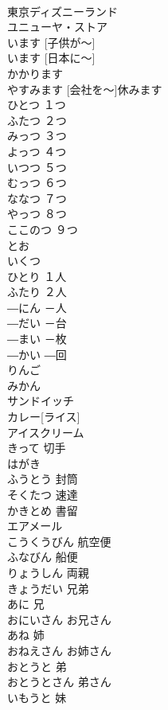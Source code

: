\documentclass[8pt]{extreport}
\begin{document}
\begin{CJK}{UTF8}{min}
\\	東京ディズニーランド		
\\	ユニューヤ・ストア			
\\	[こどもが～] います	[子供が～]	
\\	[にほんに～] います	[日本に～]	
\\	かかります			
\\	[かいしゃを～] やすみます	[会社を～]休みます	
\\	ひとつ	１つ		
\\	ふたつ	２つ		
\\	みっつ	３つ		
\\	よっつ	４つ		
\\	いつつ	５つ		
\\	むっつ	６つ		
\\	ななつ	７つ		
\\	やっつ	８つ		
\\	ここのつ	９つ		
\\	とお	
\\	いくつ			
\\	ひとり	１人	
\\	ふたり	２人	
\\	―にん	－人	
\\	―だい	－台	
\\	―まい	－枚	
\\	―かい	―回	
\\	りんご			
\\	みかん			
\\	サンドイッチ			
\\	カレー[ライス]			
\\	アイスクリーム			
\\	きって	切手	
\\	はがき			
\\	ふうとう	封筒	
\\	そくたつ	速達	
\\	かきとめ	書留	
\\	エアメール			
\\	こうくうびん	航空便	
\\	ふなびん	船便	
\\	りょうしん	両親	
\\	きょうだい	兄弟	
\\	あに	兄	
\\	おにいさん	お兄さん	
\\	あね	姉	
\\	おねえさん	お姉さん	
\\	おとうと	弟	
\\	おとうとさん	弟さん	
\\	いもうと	妹	

\end{CJK}
\end{document}
